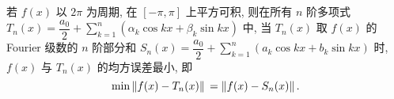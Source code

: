 \begin{theorem}[均方逼近]
    若 $f(x)$ 以 $2\pi$ 为周期, 在 $[-\pi,\pi]$ 上平方可积, 则在所有 $n$ 阶多项式 $\displaystyle T_n(x)=\dfrac{a_0}{2}+\sum_{k=1}^{n}(\alpha_k\cos kx+\beta_k\sin kx)$ 中, 
    当 $T_n(x)$ 取 $f(x)$ 的 Fourier 级数的 $n$ 阶部分和 $\displaystyle S_n(x)=\dfrac{a_0}{2}+\sum_{k=1}^{n}(a_k\cos kx+b_k\sin kx)$ 时, 
    $f(x)$ 与 $T_n(x)$ 的均方误差最小, 即 
    $$\min\norm*{f(x)-T_n(x)}=\norm*{f(x)-S_n(x)}.$$
\end{theorem}